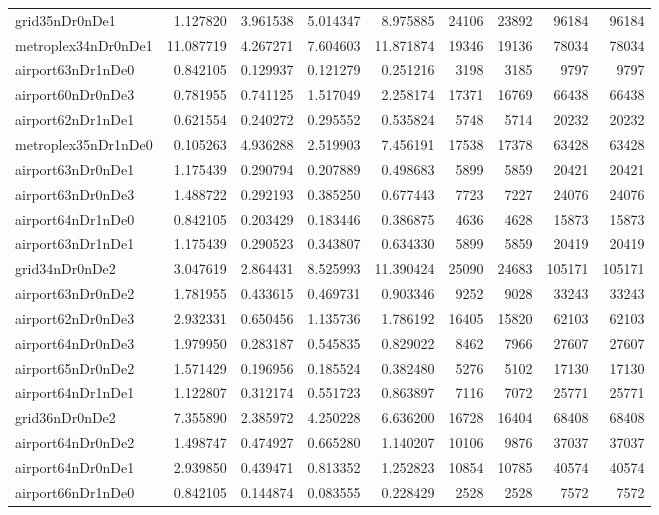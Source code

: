 \begin{longtable}{|l|r|r|r|r|r|r|r|r|}
grid35nDr0nDe1 & 1.127820 & 3.961538 & 5.014347 & 8.975885 & 24106 & 23892 & 96184 & 96184 \\
metroplex34nDr0nDe1 & 11.087719 & 4.267271 & 7.604603 & 11.871874 & 19346 & 19136 & 78034 & 78034 \\
airport63nDr1nDe0 & 0.842105 & 0.129937 & 0.121279 & 0.251216 & 3198 & 3185 & 9797 & 9797 \\
airport60nDr0nDe3 & 0.781955 & 0.741125 & 1.517049 & 2.258174 & 17371 & 16769 & 66438 & 66438 \\
airport62nDr1nDe1 & 0.621554 & 0.240272 & 0.295552 & 0.535824 & 5748 & 5714 & 20232 & 20232 \\
metroplex35nDr1nDe0 & 0.105263 & 4.936288 & 2.519903 & 7.456191 & 17538 & 17378 & 63428 & 63428 \\
airport63nDr0nDe1 & 1.175439 & 0.290794 & 0.207889 & 0.498683 & 5899 & 5859 & 20421 & 20421 \\
airport63nDr0nDe3 & 1.488722 & 0.292193 & 0.385250 & 0.677443 & 7723 & 7227 & 24076 & 24076 \\
airport64nDr1nDe0 & 0.842105 & 0.203429 & 0.183446 & 0.386875 & 4636 & 4628 & 15873 & 15873 \\
airport63nDr1nDe1 & 1.175439 & 0.290523 & 0.343807 & 0.634330 & 5899 & 5859 & 20419 & 20419 \\
grid34nDr0nDe2 & 3.047619 & 2.864431 & 8.525993 & 11.390424 & 25090 & 24683 & 105171 & 105171 \\
airport63nDr0nDe2 & 1.781955 & 0.433615 & 0.469731 & 0.903346 & 9252 & 9028 & 33243 & 33243 \\
airport62nDr0nDe3 & 2.932331 & 0.650456 & 1.135736 & 1.786192 & 16405 & 15820 & 62103 & 62103 \\
airport64nDr0nDe3 & 1.979950 & 0.283187 & 0.545835 & 0.829022 & 8462 & 7966 & 27607 & 27607 \\
airport65nDr0nDe2 & 1.571429 & 0.196956 & 0.185524 & 0.382480 & 5276 & 5102 & 17130 & 17130 \\
airport64nDr1nDe1 & 1.122807 & 0.312174 & 0.551723 & 0.863897 & 7116 & 7072 & 25771 & 25771 \\
grid36nDr0nDe2 & 7.355890 & 2.385972 & 4.250228 & 6.636200 & 16728 & 16404 & 68408 & 68408 \\
airport64nDr0nDe2 & 1.498747 & 0.474927 & 0.665280 & 1.140207 & 10106 & 9876 & 37037 & 37037 \\
airport64nDr0nDe1 & 2.939850 & 0.439471 & 0.813352 & 1.252823 & 10854 & 10785 & 40574 & 40574 \\
airport66nDr1nDe0 & 0.842105 & 0.144874 & 0.083555 & 0.228429 & 2528 & 2528 & 7572 & 7572 \\

\end{longtable}
